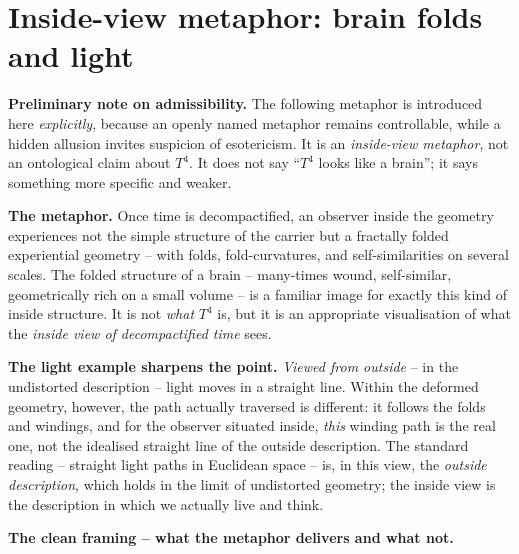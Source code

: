 \section{Inside-view metaphor: brain folds and light}

\textbf{Preliminary note on admissibility.} The following metaphor is
introduced here \emph{explicitly}, because an openly named metaphor
remains controllable, while a hidden allusion invites suspicion of
esotericism. It is an \emph{inside-view metaphor}, not an ontological
claim about $T^4$. It does not say ``$T^4$ looks like a brain''; it
says something more specific and weaker.

\textbf{The metaphor.} Once time is decompactified, an observer
inside the geometry experiences not the simple structure of the
carrier but a fractally folded experiential geometry -- with folds,
fold-curvatures, and self-similarities on several scales. The
folded structure of a brain -- many-times wound, self-similar,
geometrically rich on a small volume -- is a familiar image for
exactly this kind of inside structure. It is not \emph{what} $T^4$
is, but it is an appropriate visualisation of what the
\emph{inside view of decompactified time} sees.

\textbf{The light example sharpens the point.} \emph{Viewed from
outside} -- in the undistorted description -- light moves in a
straight line. Within the deformed geometry, however, the path
actually traversed is different: it follows the folds and windings,
and for the observer situated inside, \emph{this} winding path is
the real one, not the idealised straight line of the outside
description. The standard reading -- straight light paths in
Euclidean space -- is, in this view, the \emph{outside description},
which holds in the limit of undistorted geometry; the inside view
is the description in which we actually live and think.

\textbf{The clean framing -- what the metaphor delivers and what
not.}

